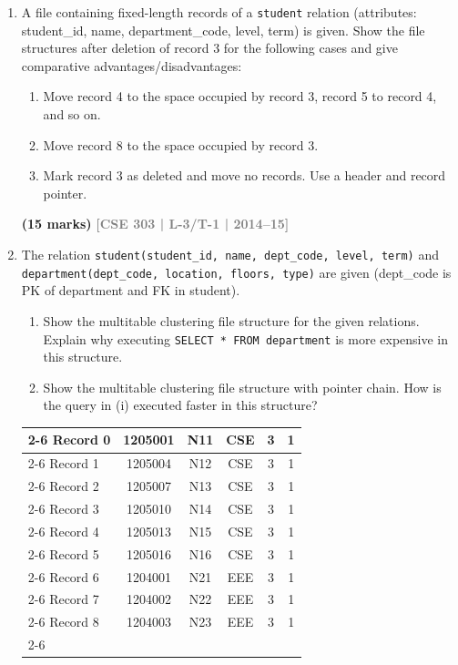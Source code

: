 \documentclass[12pt]{article}
\newcommand{\yr}[1]{\hfill\textcolor{gray}{\small\textbf{[#1]}}}
\newcommand{\mk}[1]{\textcolor{orange!70!black}{\small\textbf{(#1 marks)}}}
\begin{document}
\begin{enumerate}
\item A file containing fixed-length records of a \texttt{student} relation (attributes: student\_id, name, department\_code, level, term) is given. Show the file structures after deletion of record 3 for the following cases and give comparative advantages/disadvantages:
\begin{enumerate}
  \item Move record 4 to the space occupied by record 3, record 5 to record 4, and so on.
  \item Move record 8 to the space occupied by record 3.
  \item Mark record 3 as deleted and move no records. Use a header and record pointer.
\end{enumerate}
\mk{15} \yr{CSE 303 | L-3/T-1 | 2014--15}


\item The relation \texttt{student(student\_id, name, dept\_code, level, term)} and \texttt{department(dept\_code, location, floors, type)} are given (dept\_code is PK of department and FK in student).
\begin{enumerate}
  \item Show the multitable clustering file structure for the given relations. Explain why executing \texttt{SELECT * FROM department} is more expensive in this structure.
  \item Show the multitable clustering file structure with pointer chain. How is the query in (i) executed faster in this structure?
\end{enumerate}

\begin{center}
  \renewcommand{\arraystretch}{1.3} %
    \begin{tabular}{l |c|c|c|c|c|}
        \cline{2-6}
        Record 0 & 1205001 & N11 & CSE & 3 & 1 \\
        \cline{2-6}
        Record 1 & 1205004 & N12 & CSE & 3 & 1 \\
        \cline{2-6}
        Record 2 & 1205007 & N13 & CSE & 3 & 1 \\
        \cline{2-6}
        Record 3 & 1205010 & N14 & CSE & 3 & 1 \\
        \cline{2-6}
        Record 4 & 1205013 & N15 & CSE & 3 & 1 \\
        \cline{2-6}
        Record 5 & 1205016 & N16 & CSE & 3 & 1 \\
        \cline{2-6}
        Record 6 & 1204001 & N21 & EEE & 3 & 1 \\
        \cline{2-6}
        Record 7 & 1204002 & N22 & EEE & 3 & 1 \\
        \cline{2-6}
        Record 8 & 1204003 & N23 & EEE & 3 & 1 \\
        \cline{2-6}
    \end{tabular}
    

\end{center}
\end{enumerate}
\end{document}

